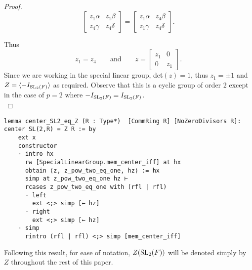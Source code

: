 \begin{proof}
\begin{equation*} \begin{bmatrix} z_1 \alpha & z_1 \beta \\ z_4 \gamma & z_4 \delta \end{bmatrix} = \begin{bmatrix} z_1 \alpha & z_4 \beta \\ z_1 \gamma & z_4 \delta \end{bmatrix}. \end{equation*}

Thus 
\begin{equation*} 
    z_1 = z_4 \qquad  \text{and} \qquad z =  
    \begin{bmatrix} z_1 & 0 \\ 0 & z_1 \end{bmatrix}. 
\end{equation*}
Since we are working in the special linear group, det$(z)=1$, thus $z_1 = \pm 1$ and $Z = \langle - I_{\operatorname{SL}_2(F)}\rangle$ as required. Observe that this is a cyclic group of order 2 except in the case of $p = 2$ where $- I_{\operatorname{SL}_2(F)} = I_{\operatorname{SL}_2(F)}$. \\
\end{proof}
\begin{footnotesize}
\begin{verbatim}
lemma center_SL2_eq_Z (R : Type*)  [CommRing R] [NoZeroDivisors R]: center SL(2,R) = Z R := by
    ext x
    constructor
    · intro hx
      rw [SpecialLinearGroup.mem_center_iff] at hx
      obtain ⟨z, z_pow_two_eq_one, hz⟩ := hx
      simp at z_pow_two_eq_one hz ⊢
      rcases z_pow_two_eq_one with (rfl | rfl)
      · left
        ext <;> simp [← hz]
      · right
        ext <;> simp [← hz]
    · simp
      rintro (rfl | rfl) <;> simp [mem_center_iff]
\end{verbatim}
\end{footnotesize}

Following this result, for ease of notation, $Z(\operatorname{SL}_2(F))$ will be denoted simply by $Z$ throughout the rest of this paper.


